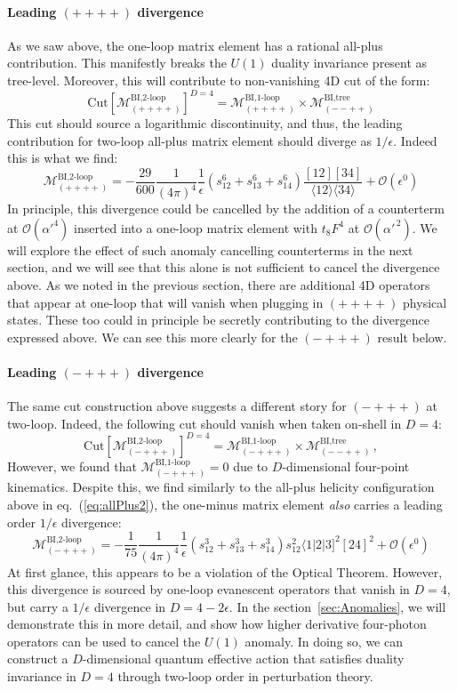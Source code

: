 \documentclass[12pt,letter]{article}
\def\sect#1{section~\ref{#1}}
\def\eqn#1{eq.~(\ref{#1})}
\def\be{\begin{equation}}
\def\ee{\end{equation}}
\begin{document}
\paragraph{Leading $(++++)$ divergence} As we saw above, the one-loop matrix element has a rational all-plus contribution. This manifestly breaks the $U(1)$ duality invariance present as tree-level. Moreover, this will contribute to non-vanishing 4D cut of the form:
\be
\text{Cut}\left[\mathcal{M}^{\text{BI,2-loop}}_{(++++)} \right]^{D=4} = \mathcal{M}^{\text{BI,1-loop}}_{(++++)} \times \mathcal{M}^{\text{BI,tree}}_{(--++)} 
\ee
This cut should source a logarithmic discontinuity, and thus, the leading contribution for two-loop all-plus matrix element should diverge as $1/\epsilon$. Indeed this is what we find:
\be\label{eq:allPlus2}
\boxed{\mathcal{M}^{\text{BI,2-loop}}_{(++++)} = -\frac{29}{600} \frac{1}{(4\pi)^4}\frac{1}{\epsilon}(s_{12}^6+s_{13}^6+s_{14}^6)\frac{[12][34]}{\langle 12\rangle \langle 34\rangle }+\mathcal{O}(\epsilon^0)}
\ee
In principle, this divergence could be cancelled by the addition of a counterterm at $\mathcal{O}(\alpha'^4)$ inserted into a one-loop matrix element with $t_8F^4$ at $\mathcal{O}(\alpha'^{\,2})$. We will explore the effect of such anomaly cancelling counterterms in the next section, and we will see that this alone is not sufficient to cancel the divergence above. As we noted in the previous section, there are additional 4D operators that appear at one-loop that will vanish when plugging in $(++++)$ physical states. These too could in principle be secretly contributing to the divergence expressed above. We can see this more clearly for the $(-+++)$ result below. 
\paragraph{Leading $(-+++)$ divergence} The same cut construction above suggests a different story for $(-+++)$ at two-loop. Indeed, the following cut should vanish when taken on-shell in $D=4$:
\be
\text{Cut}\left[\mathcal{M}^{\text{BI,2-loop}}_{(-+++)} \right]^{D=4} = \mathcal{M}^{\text{BI,1-loop}}_{(-+++)} \times \mathcal{M}^{\text{BI,tree}}_{(--++)}\,,
\ee
However, we found that $\mathcal{M}^{\text{BI,1-loop}}_{(-+++)} =0$ due to $D$-dimensional four-point kinematics. Despite this, we find similarly to the all-plus helicity configuration above in \eqn{eq:allPlus2}, the one-minus matrix element \textit{also} carries a leading order $1/\epsilon$ divergence:
\be\label{eq:oneMinus2loop}
\boxed{\mathcal{M}^{\text{BI,2-loop}}_{(-+++)} = -\frac{1}{75} \frac{1}{(4\pi)^4}\frac{1}{\epsilon}(s_{12}^3+s_{13}^3+s_{14}^3)s_{12}^2 \langle 1|2|3]^2[24]^2 +\mathcal{O}(\epsilon^0)}
\ee
At first glance, this appears to be a violation of the Optical Theorem. However, this divergence is sourced by one-loop evanescent operators that vanish in $D=4$, but carry a $1/\epsilon$ divergence in $D=4-2\epsilon$. In the \sect{sec:Anomalies}, we will demonstrate this in more detail, and show how higher derivative four-photon operators can be used to cancel the $U(1)$ anomaly. In doing so, we can construct a $D$-dimensional quantum effective action that satisfies duality invariance in $D=4$ through two-loop order in perturbation theory.  
\end{document}
